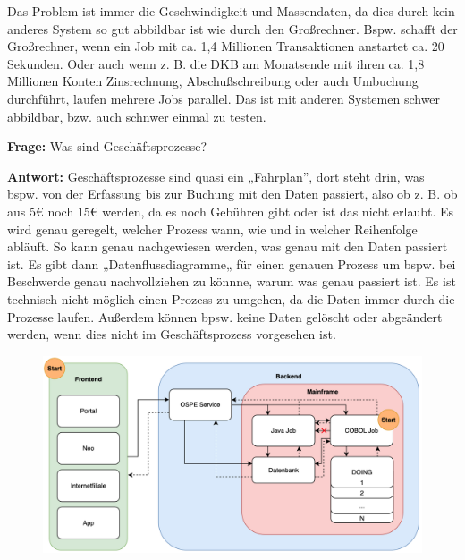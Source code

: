 Das Problem ist immer die Geschwindigkeit und Massendaten, da dies durch kein anderes System so gut abbildbar ist wie durch den Großrechner.
Bspw. schafft der Großrechner, wenn ein Job mit ca. 1,4 Millionen Transaktionen anstartet ca. 20 Sekunden.
Oder auch wenn z. B. die DKB am Monatsende mit ihren ca. 1,8 Millionen Konten Zinsrechnung, Abschußschreibung oder auch Umbuchung durchführt, laufen mehrere Jobs parallel.
Das ist mit anderen Systemen schwer abbildbar, bzw. auch schnwer einmal zu testen.

\bigbreak
\bigbreak

\textbf{Frage:}
\label{i1:f5}
Was sind Geschäftsprozesse?


\textbf{Antwort:}
Geschäftsprozesse sind quasi ein „Fahrplan”, dort steht drin, was bspw. von der Erfassung bis zur Buchung mit den Daten passiert, also ob z. B. ob aus 5€ noch 15€ werden, da es noch Gebühren gibt oder ist das nicht erlaubt.
Es wird genau geregelt, welcher Prozess wann, wie und in welcher Reihenfolge abläuft.
So kann genau nachgewiesen werden, was genau mit den Daten passiert ist.
Es gibt dann „Datenflussdiagramme„ für einen genauen Prozess um bspw. bei Beschwerde genau nachvollziehen zu könnne, warum was genau passiert ist.
Es ist technisch nicht möglich einen Prozess zu umgehen, da die Daten immer durch die Prozesse laufen.
Außerdem können bpsw. keine Daten gelöscht oder abgeändert werden, wenn dies nicht im Geschäftsprozess vorgesehen ist.

\newpage

\label{a1}
\begin{figure}[ht]
    \centering\includegraphics[width=1.0\textwidth]{Abbildungen/OSPlus-Diagramm.png}
\end{figure}

\newpage

\bigbreak
